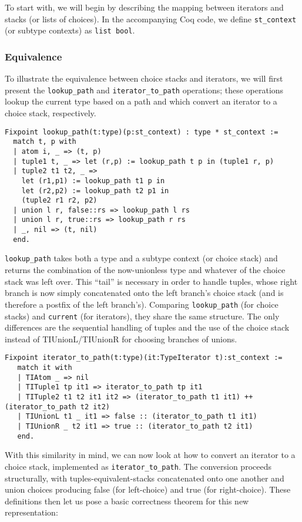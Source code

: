 \documentclass[a4paper,UKenglish]{lipics-v2018}
\begin{document}
To start with, we will begin by describing the mapping between iterators and
stacks (or lists of choices). In the accompanying Coq code, we define
\verb|st_context| (or subtype contexts) as \verb|list bool|.

\subsubsection{Equivalence}

To illustrate the equivalence between choice stacks and iterators, we will
first present the \verb|lookup_path| and \verb|iterator_to_path| operations;
these operations lookup the current type based on a path and which convert an
iterator to a choice stack, respectively. 

\begin{verbatim}
Fixpoint lookup_path(t:type)(p:st_context) : type * st_context :=
  match t, p with
  | atom i, _ => (t, p)
  | tuple1 t, _ => let (r,p) := lookup_path t p in (tuple1 r, p)
  | tuple2 t1 t2, _ =>
    let (r1,p1) := lookup_path t1 p in
    let (r2,p2) := lookup_path t2 p1 in
    (tuple2 r1 r2, p2)
  | union l r, false::rs => lookup_path l rs
  | union l r, true::rs => lookup_path r rs
  | _, nil => (t, nil)
  end.
\end{verbatim}

\verb|lookup_path| takes both a type and a subtype context (or choice stack)
and returns the combination of the now-unionless type and whatever of the
choice stack was left over. This ``tail'' is necessary in order to handle
tuples, whose right branch is now simply concatenated onto the left branch's
choice stack (and is therefore a postfix of the left branch's). Comparing
\verb|lookup_path| (for choice stacks) and \verb|current| (for iterators), 
they share the same structure. The only differences are the sequential handling
of tuples and the use of the choice stack instead of TIUnionL/TIUnionR for
choosing branches of unions.

\begin{verbatim}
Fixpoint iterator_to_path(t:type)(it:TypeIterator t):st_context :=
   match it with
   | TIAtom _ => nil
   | TITuple1 tp it1 => iterator_to_path tp it1
   | TITuple2 t1 t2 it1 it2 => (iterator_to_path t1 it1) ++ (iterator_to_path t2 it2)
   | TIUnionL t1 _ it1 => false :: (iterator_to_path t1 it1)
   | TIUnionR _ t2 it1 => true :: (iterator_to_path t2 it1)
   end.
\end{verbatim}

With this similarity in mind, we can now look at how to convert an iterator to
a choice stack, implemented as \verb|iterator_to_path|. The conversion
proceeds structurally, with tuples-equivalent-stacks concatenated onto one
another and union choices producing false (for left-choice) and true (for
right-choice). These definitions then let us pose a basic correctness theorem
for this new representation:
\end{document}
